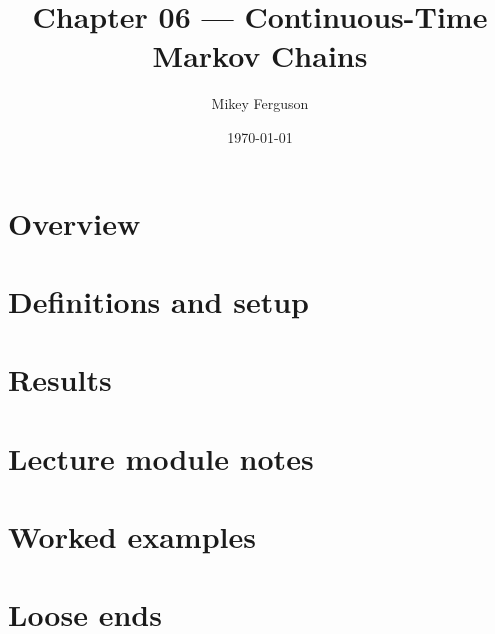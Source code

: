 \documentclass[11pt]{article}
\title{Chapter 06 --- Continuous-Time Markov Chains}
\author{Mikey Ferguson}
\date{\today}
\begin{document}
\maketitle
\tableofcontents
\bigskip

\section{Overview}

\section{Definitions and setup}

\section{Results}

\section{Lecture module notes}

\section{Worked examples}

\section{Loose ends}
\end{document}
